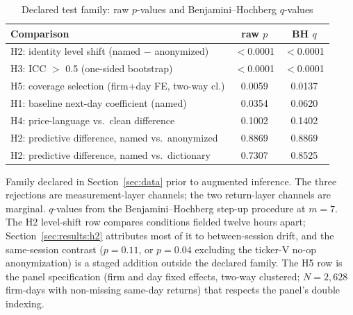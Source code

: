 \begin{table}[htbp]
\centering
\small
\caption{Declared test family: raw $p$-values and Benjamini--Hochberg $q$-values}
\label{tab:bh}
\begin{tabular}{lcc}
\toprule
Comparison & raw $p$ & BH $q$ \\
\midrule
H2: identity level shift (named $-$ anonymized) & $<$0.0001 & $<$0.0001 \\
H3: ICC $>$ 0.5 (one-sided bootstrap) & $<$0.0001 & $<$0.0001 \\
H5: coverage selection (firm+day FE, two-way cl.) & 0.0059 & 0.0137 \\
H1: baseline next-day coefficient (named) & 0.0354 & 0.0620 \\
H4: price-language vs.\ clean difference & 0.1002 & 0.1402 \\
H2: predictive difference, named vs.\ anonymized & 0.8869 & 0.8869 \\
H2: predictive difference, named vs.\ dictionary & 0.7307 & 0.8525 \\
\bottomrule
\end{tabular}
\begin{tablenotes}[flushleft]\footnotesize
\item Family declared in Section~\ref{sec:data} prior to augmented inference. The three rejections are measurement-layer channels; the two return-layer channels are marginal. $q$-values from the Benjamini--Hochberg step-up procedure at $m=7$. The H2 level-shift row compares conditions fielded twelve hours apart; Section~\ref{sec:results:h2} attributes most of it to between-session drift, and the same-session contrast ($p=0.11$, or $p=0.04$ excluding the ticker-V no-op anonymization) is a staged addition outside the declared family. The H5 row is the panel specification (firm and day fixed effects, two-way clustered; $N=2{,}628$ firm-days with non-missing same-day returns) that respects the panel's double indexing.
\end{tablenotes}
\end{table}
